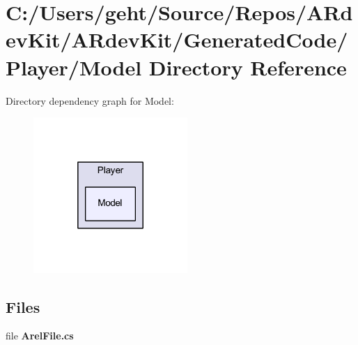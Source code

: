 \section{C\-:/\-Users/geht/\-Source/\-Repos/\-A\-Rdev\-Kit/\-A\-Rdev\-Kit/\-Generated\-Code/\-Player/\-Model Directory Reference}
\label{dir_071d023afdc7745c0ebbb6cd2dc6faa1}
Directory dependency graph for Model\-:
\nopagebreak
\begin{figure}[H]
\begin{center}
\leavevmode
\includegraphics[width=166pt]{dir_071d023afdc7745c0ebbb6cd2dc6faa1_dep}
\end{center}
\end{figure}
\subsection*{Files}
\begin{DoxyCompactItemize}
\item 
file {\bfseries Arel\-File.\-cs}
\end{DoxyCompactItemize}
